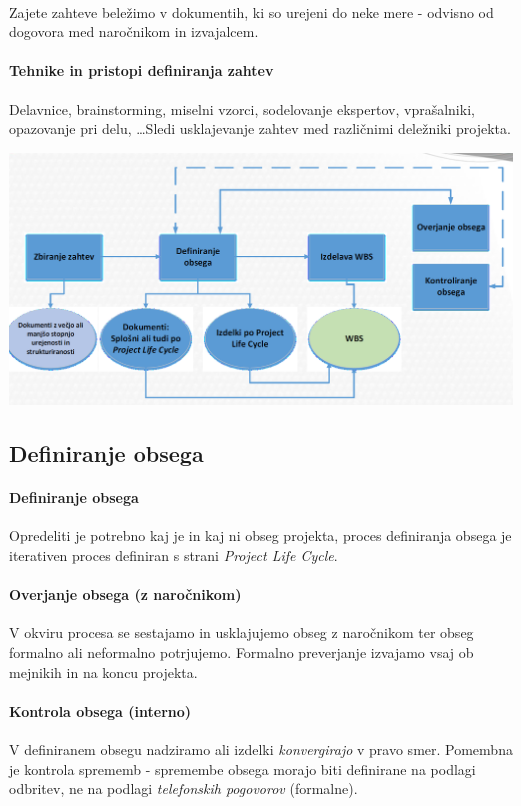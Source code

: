\documentclass[a4paper,12pt]{report}
\begin{document}
         \paragraph{}Zajete zahteve beležimo v dokumentih, ki so urejeni do neke mere - odvisno od dogovora med naročnikom in izvajalcem.
         \paragraph{Tehnike in pristopi definiranja zahtev} Delavnice, brainstorming, miselni vzorci, sodelovanje ekspertov, vprašalniki, opazovanje pri delu, \dots Sledi usklajevanje zahtev med različnimi deležniki projekta.

         \includegraphics[scale=0.3]{011.png}

      \subsection{Definiranje obsega}
         \paragraph{Definiranje obsega} Opredeliti je potrebno kaj je in kaj ni obseg projekta, proces definiranja obsega je iterativen proces definiran s strani \emph{Project Life Cycle}.
         \paragraph{Overjanje obsega (z naročnikom)} V okviru procesa se sestajamo in usklajujemo obseg z naročnikom ter obseg formalno ali neformalno potrjujemo. Formalno preverjanje izvajamo vsaj ob mejnikih in na koncu projekta.
         \paragraph{Kontrola obsega (interno)} V definiranem obsegu nadziramo ali izdelki \emph{konvergirajo} v pravo smer. Pomembna je kontrola sprememb - spremembe obsega morajo biti definirane na podlagi odbritev, ne na podlagi \emph{telefonskih pogovorov} (formalne).
\end{document}
